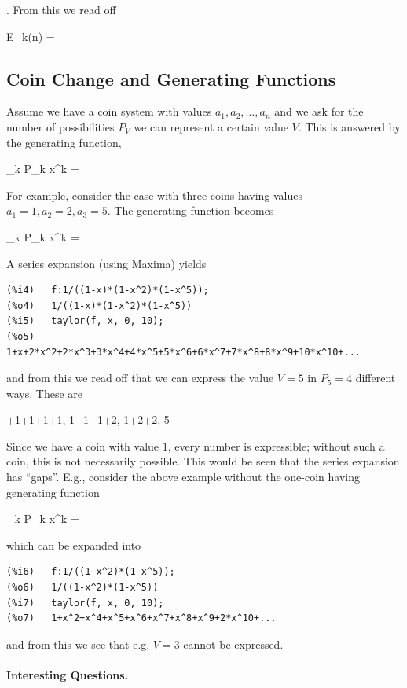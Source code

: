 . From this we read off

\bee
E_k(n) = 
\eee


\subsection{Coin Change and Generating Functions}

Assume we have a coin system with values $a_1, a_2, \ldots, a_n$ and we ask for the number of possibilities $P_V$ we can represent a certain value $V$. This is answered by the generating function,

\bee
\sum_{k } P_k x^k = 
\eee

For example, consider the case with three coins having values $a_1=1, a_2=2, a_3=5$. The generating function becomes

\bee
\sum_{k } P_k x^k = 
\eee

A series expansion (using Maxima) yields

\begin{verbatim}
(%i4)	f:1/((1-x)*(1-x^2)*(1-x^5));
(%o4)	1/((1-x)*(1-x^2)*(1-x^5))
(%i5)	taylor(f, x, 0, 10);
(%o5)	1+x+2*x^2+2*x^3+3*x^4+4*x^5+5*x^6+6*x^7+7*x^8+8*x^9+10*x^10+...
\end{verbatim}

and from this we read off that we can express the value $V=5$ in $P_5=4$ different ways. These are

+1+1+1+1, 1+1+1+2, 1+2+2, 5
\eee

Since we have a coin with value $1$, every number is expressible; without such a coin, this is not necessarily possible. This would be seen that the series expansion has ``gaps''. E.g., consider the above example without the one-coin having generating function

\bee
\sum_{k } P_k x^k = 
\eee

which can be expanded into 

\begin{verbatim}
(%i6)	f:1/((1-x^2)*(1-x^5));
(%o6)	1/((1-x^2)*(1-x^5))
(%i7)	taylor(f, x, 0, 10);
(%o7)	1+x^2+x^4+x^5+x^6+x^7+x^8+x^9+2*x^10+...
\end{verbatim}

and from this we see that e.g. $V=3$ cannot be expressed.

\paragraph{Interesting Questions.}

